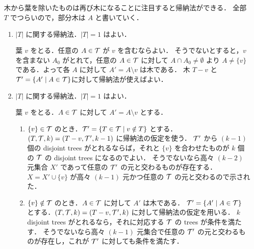 \subsection{}
木から葉を除いたものは再び木になることに注目すると帰納法ができる．
全部 $T$ でつらいので，部分木は $A$ と書いていく．

\begin{enumerate}
 \item $|T|$ に関する帰納法．$|T| = 1$ はよい．

 葉 $v$ をとる．任意の $A \in \mathcal{T}$ が $v$ を含むならよい．
 そうでないとすると，$v$ を含まない $A_0$ がとれて，任意の $A\in \mathcal{T}$ に対して $A\cap A_0\neq \emptyset$ より
 $A\neq \{v\}$ である．よって各 $A$ に対して $A' = A\setminus v$ は木である．
 木 $T - v$ と $\mathcal{T}' = \{A'\mid A\in \mathcal{T}\}$に対して帰納法が使えばよい．
 \item $|T|$ に関する帰納法．$|T|=1$ はよい．

 葉 $v$ をとる．$A\in \mathcal{T}$ に対して $A' = A\setminus v$ とする．
 \begin{enumerate}
  \item $\{v\} \in \mathcal{T}$ のとき．$\mathcal{T}' = \{T\in \mathcal{T}\mid v\notin T\}$ とする．
  $(T, \mathcal{T}, k) = (T-v, \mathcal{T}', k-1)$ に帰納法の仮定を使う．
  $\mathcal{T}'$ から $(k-1)$ 個の disjoint trees がとれるならば，それと $\{v\}$ を合わせたものが $k$ 個の $\mathcal{T}$ の disjoint trees になるのでよい．
  そうでないなら高々 $(k-2)$ 元集合 $X'$ であって任意の $\mathcal{T}'$ の元と交わるものが存在する．
  $X = X' \cup \{v\}$ が高々 $(k-1)$ 元かつ任意の $\mathcal{T}$ の元と交わるので示された．
  \item $\{v\}\notin \mathcal{T}$ のとき．$A\in \mathcal{T}$ に対して $A'$ は木である．
  $\mathcal{T}' = \{A'\mid A\in \mathcal{T}\}$ とする．$(T, \mathcal{T}, k) = (T-v, \mathcal{T}', k)$ に対して帰納法の仮定を用いる．
  $k$ disjoint trees がとれるなら，それに対応する $\mathcal{T}$ の trees が条件を満たす．
  そうでないなら高々 $(k-1)$ 元集合で任意の $\mathcal{T}'$ の元と交わるものが存在し，これが $\mathcal{T}'$ に対しても条件を満たす．
 \end{enumerate}
\end{enumerate}